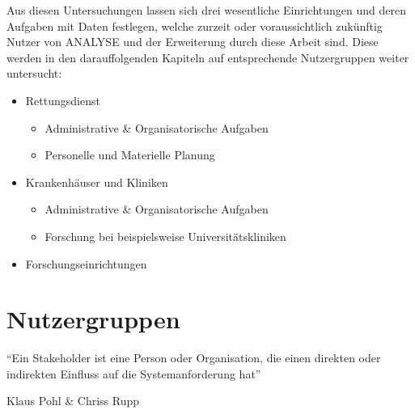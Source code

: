 Aus diesen Untersuchungen lassen sich drei wesentliche Einrichtungen und deren Aufgaben mit Daten festlegen, welche zurzeit oder voraussichtlich zukünftig Nutzer von \gls{ANALYSE} und der Erweiterung durch diese Arbeit sind. 
Diese werden in den darauffolgenden Kapiteln auf entsprechende Nutzergruppen weiter untersucht:
\begin{itemize}
 \item Rettungsdienst
	 \begin{itemize}
	 \item Administrative \& Organisatorische Aufgaben
	 \item Personelle und Materielle Planung
	 \end{itemize}
 \item Krankenhäuser und Kliniken
	 \begin{itemize}
	 \item Administrative \& Organisatorische Aufgaben
	 \item Forschung bei beispielsweise Universitätskliniken
	 \end{itemize}
 \item Forschungseinrichtungen
\end{itemize} 




\section{Nutzergruppen}
\label{sec:nutzergruppen}
\epigraph{"`Ein Stakeholder ist eine Person oder Organisation, die einen direkten oder indirekten Einfluss auf die Systemanforderung hat"'} {Klaus Pohl \& Chriss Rupp \cite[S.29]{Pohl.2011}}

